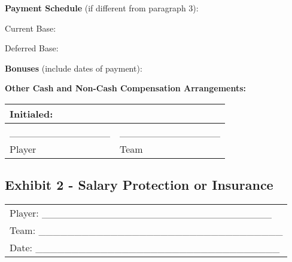 \documentclass[
]{book}
\begin{document}
\textbf{Payment Schedule} (if different from paragraph 3):

Current Base:

Deferred Base:

\textbf{Bonuses} (include dates of payment):

\textbf{Other Cash and Non-Cash Compensation Arrangements:}

\begin{longtable}[]{@{}ll@{}}
\toprule()
Initialed: & \\
\midrule()
\endhead
\_\_\_\_\_\_\_\_\_\_\_\_\_\_ & \_\_\_\_\_\_\_\_\_\_\_\_\_\_ \\
Player & Team \\
\bottomrule()
\end{longtable}

\newpage

\hypertarget{exhibit-2---salary-protection-or-insurance}{%
\subsection{Exhibit 2 - Salary Protection or Insurance}\label{exhibit-2---salary-protection-or-insurance}}

\begin{longtable}[]{@{}l@{}}
\toprule()
\endhead
Player: \_\_\_\_\_\_\_\_\_\_\_\_\_\_\_\_\_\_\_\_\_\_\_\_\_\_\_\_\_\_\_\_ \\
Team: \_\_\_\_\_\_\_\_\_\_\_\_\_\_\_\_\_\_\_\_\_\_\_\_\_\_\_\_\_\_\_\_\_\_ \\
Date: \_\_\_\_\_\_\_\_\_\_\_\_\_\_\_\_\_\_\_\_\_\_\_\_\_\_\_\_\_\_\_\_\_\_ \\
\bottomrule()
\end{longtable}
\end{document}
